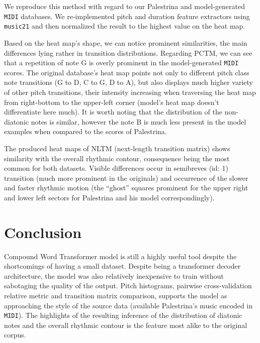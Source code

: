 \documentclass{article}
\begin{document}
\begin{multicols}{2}
        We reproduce this method with regard to our Palestrina and model-generated \texttt{MIDI} databases. We re-implemented pitch and duration feature extractors using \texttt{music21} and then normalized the result to the highest value on the heat map.

        Based on the heat map's shape, we can notice prominent similarities, the main differences lying rather in transition distributions. Regarding PCTM, we can see that a repetition of note G is overly prominent in the model-generated \texttt{MIDI} scores. The original database's heat map points not only to different pitch class note transitions (G to D, C to G, D to A), but also displays much higher variety of other pitch transitions, their intensity increasing when traversing the heat map from right-bottom to the upper-left corner (model's heat map doesn't differentiate here much). It is worth noting that the distribution of the non-diatonic notes is similar, however the note B\flat{} is much less present in the model examples when compared to the scores of Palestrina.

        The produced heat maps of NLTM (next-length transition matrix) shows similarity with the overall rhythmic contour, \minim{} \minim{} consequence being the most common for both datasets. Visible differences occur in semibreves (id: 1) transition (much more prominent in the originals) and occurrence of the slower and faster rhythmic motion (the ``ghost'' squares prominent for the upper right and lower left sectors for Palestrina and his model correspondingly).
        
    \section{Conclusion}
    Compound Word Transformer model \cite{hsiao_compound_2021} is still a highly useful tool despite the shortcomings of having a small dataset. Despite being a transformer decoder architecture, the model was also relatively inexpensive to train without sabotaging the quality of the output. Pitch histograms, pairwise cross-validation relative metric and transition matrix comparison, supports the model as approaching the style of the source data (available Palestrina's music encoded in \texttt{MIDI}). The highlights of the resulting inference of the distribution of diatonic notes and the overall rhythmic contour is the feature most alike to the original corpus.

\end{multicols}
\end{document}
